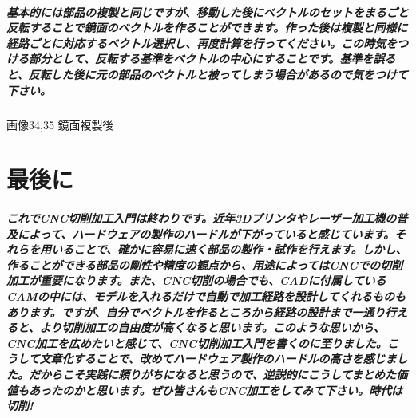 \documentclass[b5paper, 9pt, twocolumn, titlepage,openany]{jsbook}%
\begin{document}
\paragraph{基本的には部品の複製と同じですが、移動した後にベクトルのセットをまるごと反転することで鏡面のベクトルを作ることができます。作った後は複製と同様に経路ごとに対応するベクトル選択し、再度計算を行ってください。この時気をつける部分として、反転する基準をベクトルの中心にすることです。基準を誤ると、反転した後に元の部品のベクトルと被ってしまう場合があるので気をつけて下さい。}

画像34,35 鏡面複製後

\chapter{最後に}
\paragraph{これでCNC切削加工入門は終わりです。近年3Dプリンタやレーザー加工機の普及によって、ハードウェアの製作のハードルが下がっていると感じています。それらを用いることで、確かに容易に速く部品の製作・試作を行えます。しかし、作ることができる部品の剛性や精度の観点から、用途によってはCNCでの切削加工が重要になります。また、CNC切削の場合でも、CADに付属しているCAMの中には、モデルを入れるだけで自動で加工経路を設計してくれるものもあります。ですが、自分でベクトルを作るところから経路の設計まで一通り行えると、より切削加工の自由度が高くなると思います。このような思いから、CNC加工を広めたいと感じて、CNC切削加工入門を書くのに至りました。こうして文章化することで、改めてハードウェア製作のハードルの高さを感じました。だからこそ実践に頼りがちになると思うので、逆説的にこうしてまとめた価値もあったのかと思います。ぜひ皆さんもCNC加工をしてみて下さい。時代は切削!}



\end{document}
